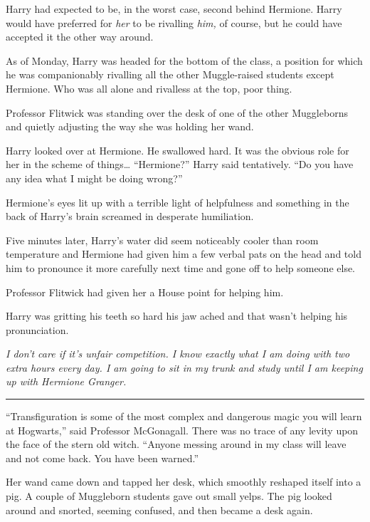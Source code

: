 Harry had expected to be, in the worst case, second behind Hermione.
Harry would have preferred for \emph{her} to be rivalling \emph{him,} of
course, but he could have accepted it the other way around.

As of Monday, Harry was headed for the bottom of the class, a position
for which he was companionably rivalling all the other Muggle-raised
students except Hermione. Who was all alone and rivalless at the top,
poor thing.

Professor Flitwick was standing over the desk of one of the other
Muggleborns and quietly adjusting the way she was holding her wand.

Harry looked over at Hermione. He swallowed hard. It was the obvious
role for her in the scheme of things\ldots{} ``Hermione?'' Harry said
tentatively. ``Do you have any idea what I might be doing wrong?''

Hermione's eyes lit up with a terrible light of helpfulness and
something in the back of Harry's brain screamed in desperate
humiliation.

Five minutes later, Harry's water did seem noticeably cooler than room
temperature and Hermione had given him a few verbal pats on the head and
told him to pronounce it more carefully next time and gone off to help
someone else.

Professor Flitwick had given her a House point for helping him.

Harry was gritting his teeth so hard his jaw ached and that wasn't
helping his pronunciation.

\emph{I don't care if it's unfair competition. I know exactly what I am
doing with two extra hours every day. I am going to sit in my trunk and
study until I am keeping up with Hermione Granger.}

\begin{center}\rule{3in}{0.4pt}\end{center}

``Transfiguration is some of the most complex and dangerous magic you
will learn at Hogwarts,'' said Professor McGonagall. There was no trace
of any levity upon the face of the stern old witch. ``Anyone messing
around in my class will leave and not come back. You have been warned.''

Her wand came down and tapped her desk, which smoothly reshaped itself
into a pig. A couple of Muggleborn students gave out small yelps. The
pig looked around and snorted, seeming confused, and then became a desk
again.

